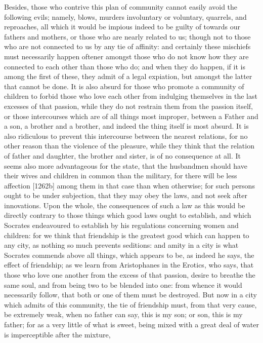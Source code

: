 Besides, those who contrive this plan of community cannot easily avoid the
following evils; namely, blows, murders involuntary or voluntary,
quarrels, and reproaches, all which it would be impious indeed to be
guilty of towards our fathers and mothers, or those who are nearly related
to us; though not to those who are not connected to us by any tie of
affinity: and certainly these mischiefs must necessarily happen oftener
amongst those who do not know how they are connected to each other than
those who do; and when they do happen, if it is among the first of these,
they admit of a legal expiation, but amongst the latter that cannot be
done. It is also absurd for those who promote a community of children to
forbid those who love each other from indulging themselves in the last
excesses of that passion, while they do not restrain them from the passion
itself, or those intercourses which are of all things most improper,
between a Father and a son, a brother and a brother, and indeed the thing
itself is most absurd. It is also ridiculous to prevent this intercourse
between the nearest relations, for no other reason than the violence of
the pleasure, while they think that the relation of father and daughter,
the brother and sister, is of no consequence at all. It seems also more
advantageous for the state, that the husbandmen should have their wives
and children in common than the military, for there will be less affection
[1262b] among them in that case than when otherwise; for such persons
ought to be under subjection, that they may obey the laws, and not seek
after innovations. Upon the whole, the consequences of such a law as this
would be directly contrary to those things which good laws ought to
establish, and which Socrates endeavoured to establish by his regulations
concerning women and children: for we think that friendship is the
greatest good which can happen to any city, as nothing so much prevents
seditions: and amity in a city is what Socrates commends above all things,
which appears to be, as indeed he says, the effect of friendship; as we
learn from Aristophanes in the Erotics, who says, that those who love one
another from the excess of that passion, desire to breathe the same soul,
and from being two to be blended into one: from whence it would
necessarily follow, that both or one of them must be destroyed. But now in
a city which admits of this community, the tie of friendship must, from
that very cause, be extremely weak, when no father can say, this is my
son; or son, this is my father; for as a very little of what is sweet,
being mixed with a great deal of water is imperceptible after the mixture,
